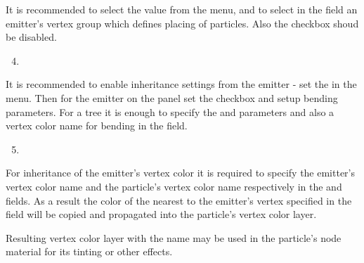 \documentclass[a4paper,12pt,oneside]{sphinxmanual}
\begin{document}
It is recommended to select the  value from the  menu, and to select in the  field an emitter's vertex group which defines placing of particles. Also the  checkbox shoud be disabled.
\begin{enumerate}
\setcounter{enumi}{3}
\item {} 

\end{enumerate}

It is recommended to enable inheritance settings from the emitter - set the  in the  menu. Then for the emitter on the  panel set the  checkbox and setup bending parameters. For a tree it is enough to specify the  and  parameters and also a vertex color name for bending in the  field.
\begin{enumerate}
\setcounter{enumi}{4}
\item {} 

\end{enumerate}

For inheritance of the emitter's vertex color it is required to specify the emitter's vertex color name and the particle's vertex color name respectively in the  and  fields. As a result the color of the nearest to the emitter's vertex specified in the  field will be copied and propagated into the  particle's vertex color layer.

Resulting vertex color layer with the  name may be used in the particle's node material for its tinting or other effects.
\end{document}
